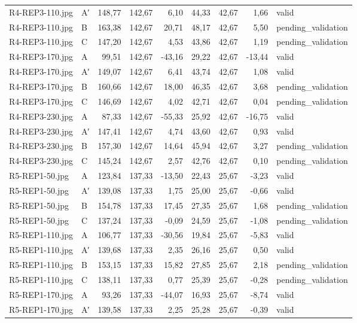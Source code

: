\begin{scriptsize}
\begin{longtable}{@{}llrrrrrrl@{}}
R4-REP3-110.jpg & A′ & 148,77 & 142,67 & 6,10 & 44,33 & 42,67 & 1,66 & valid \\
R4-REP3-110.jpg & B & 163,38 & 142,67 & 20,71 & 48,17 & 42,67 & 5,50 & pending\_validation \\
R4-REP3-110.jpg & C & 147,20 & 142,67 & 4,53 & 43,86 & 42,67 & 1,19 & pending\_validation \\
R4-REP3-170.jpg & A & 99,51 & 142,67 & -43,16 & 29,22 & 42,67 & -13,44 & valid \\
R4-REP3-170.jpg & A′ & 149,07 & 142,67 & 6,41 & 43,74 & 42,67 & 1,08 & valid \\
R4-REP3-170.jpg & B & 160,66 & 142,67 & 18,00 & 46,35 & 42,67 & 3,68 & pending\_validation \\
R4-REP3-170.jpg & C & 146,69 & 142,67 & 4,02 & 42,71 & 42,67 & 0,04 & pending\_validation \\
R4-REP3-230.jpg & A & 87,33 & 142,67 & -55,33 & 25,92 & 42,67 & -16,75 & valid \\
R4-REP3-230.jpg & A′ & 147,41 & 142,67 & 4,74 & 43,60 & 42,67 & 0,93 & valid \\
R4-REP3-230.jpg & B & 157,30 & 142,67 & 14,64 & 45,94 & 42,67 & 3,27 & pending\_validation \\
R4-REP3-230.jpg & C & 145,24 & 142,67 & 2,57 & 42,76 & 42,67 & 0,10 & pending\_validation \\
R5-REP1-50.jpg & A & 123,84 & 137,33 & -13,50 & 22,43 & 25,67 & -3,23 & valid \\
R5-REP1-50.jpg & A′ & 139,08 & 137,33 & 1,75 & 25,00 & 25,67 & -0,66 & valid \\
R5-REP1-50.jpg & B & 154,78 & 137,33 & 17,45 & 27,35 & 25,67 & 1,68 & pending\_validation \\
R5-REP1-50.jpg & C & 137,24 & 137,33 & -0,09 & 24,59 & 25,67 & -1,08 & pending\_validation \\
R5-REP1-110.jpg & A & 106,77 & 137,33 & -30,56 & 19,84 & 25,67 & -5,83 & valid \\
R5-REP1-110.jpg & A′ & 139,68 & 137,33 & 2,35 & 26,16 & 25,67 & 0,50 & valid \\
R5-REP1-110.jpg & B & 153,15 & 137,33 & 15,82 & 27,85 & 25,67 & 2,18 & pending\_validation \\
R5-REP1-110.jpg & C & 138,11 & 137,33 & 0,77 & 25,39 & 25,67 & -0,28 & pending\_validation \\
R5-REP1-170.jpg & A & 93,26 & 137,33 & -44,07 & 16,93 & 25,67 & -8,74 & valid \\
R5-REP1-170.jpg & A′ & 139,58 & 137,33 & 2,25 & 25,28 & 25,67 & -0,39 & valid \\

\end{longtable}
\end{scriptsize}
